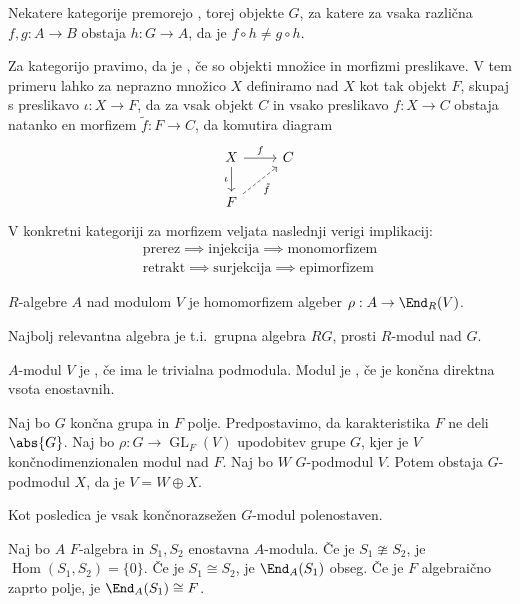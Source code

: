 Nekatere kategorije premorejo , torej objekte $G$, za katere
za vsaka različna $f, g: A \to B$ obstaja $h: G \to A$, da je $f \circ h \ne g
\circ h$.

Za kategorijo pravimo, da je , če so objekti množice in
morfizmi preslikave.
V tem primeru lahko za neprazno množico $X$ definiramo  nad
$X$ kot tak objekt $F$, skupaj s preslikavo $\iota: X \to F$, da za vsak objekt
$C$ in vsako preslikavo $f:X \to C$ obstaja natanko en morfizem $\tilde{f}: F
\to C$, da komutira diagram
\[\begin{tikzcd}
	X & C \\
	F
	\arrow["f", from=1-1, to=1-2]
	\arrow["\iota"', from=1-1, to=2-1]
	\arrow["{\tilde{f}}"', dashed, from=2-1, to=1-2]
  \end{tikzcd}\]
V konkretni kategoriji za morfizem veljata naslednji verigi implikacij:
\begin{gather*}
  \text{prerez} \implies \text{injekcija} \implies \text{monomorfizem} \\
  \text{retrakt} \implies \text{surjekcija} \implies \text{epimorfizem}
\end{gather*}


\begin{definicija}
   $R$-algebre $A$ nad modulom $V$ je homomorfizem algeber
  $\rho: A \to \End_R(V)$.
\end{definicija}

Najbolj relevantna algebra je t.i.~grupna algebra $RG$, prosti $R$-modul nad
$G$.

\begin{definicija}
  $A$-modul $V$ je , če ima le trivialna podmodula.
  Modul je , če je končna direktna vsota enostavnih.
\end{definicija}

\begin{izrek}[Maschke]
  Naj bo $G$ končna grupa in $F$ polje.
  Predpostavimo, da karakteristika $F$ ne deli $\abs{G}$.
  Naj bo $\rho: G \to \operatorname{GL}_F(V)$ upodobitev grupe $G$, kjer je $V$
  končnodimenzionalen modul nad $F$.
  Naj bo $W$ $G$-podmodul $V$.
  Potem obstaja $G$-podmodul $X$, da je $V = W \oplus X$.
\end{izrek}

Kot posledica je vsak končnorazsežen $G$-modul polenostaven.

\begin{lema}[Schur]
  Naj bo $A$ $F$-algebra in $S_1, S_2$ enostavna $A$-modula.
  Če je $S_1 \ncong S_2$, je $\operatorname{Hom}(S_1, S_2) = \{0\}$.
  Če je $S_1 \cong S_2$, je $\End_A(S_1)$ obseg.
  Če je $F$ algebraično zaprto polje, je $\End_A(S_1) \cong F$.
\end{lema}

